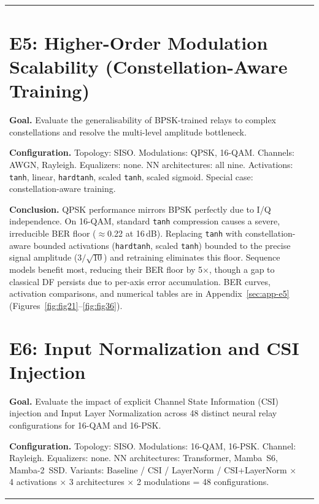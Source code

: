 {\begin{longtable}[]{@{}ll@{}}
\section{E5: Higher-Order Modulation Scalability (Constellation-Aware Training)}\label{sec:higher-order-modulation-scalability-constellation-aware-training}

\textbf{Goal.}
Evaluate the generalisability of BPSK-trained relays to complex constellations and
resolve the multi-level amplitude bottleneck.

\textbf{Configuration.}
Topology: SISO.
Modulations: QPSK, 16-QAM.
Channels: AWGN, Rayleigh.
Equalizers: none.
NN architectures: all nine.
Activations: \texttt{tanh}, linear, \texttt{hardtanh}, scaled \texttt{tanh}, scaled
sigmoid.
Special case: constellation-aware training.

\textbf{Conclusion.}
QPSK performance mirrors BPSK perfectly due to I/Q independence.
On 16-QAM, standard \texttt{tanh} compression causes a severe, irreducible BER floor
($\approx$0.22 at 16\,dB).
Replacing \texttt{tanh} with constellation-aware bounded activations
(\texttt{hardtanh}, scaled \texttt{tanh}) bounded to the precise signal amplitude
($3/\sqrt{10}$) and retraining eliminates this floor.
Sequence models benefit most, reducing their BER floor by 5$\times$, though a gap to
classical DF persists due to per-axis error accumulation.
BER curves, activation comparisons, and numerical tables are in
Appendix~\ref{sec:app-e5}
(Figures~\ref{fig:fig21}--\ref{fig:fig36}).

\section{E6: Input Normalization and CSI Injection}\label{sec:input-normalization-and-csi-injection}

\textbf{Goal.}
Evaluate the impact of explicit Channel State Information (CSI) injection and Input
Layer Normalization across 48 distinct neural relay configurations for 16-QAM and
16-PSK.

\textbf{Configuration.}
Topology: SISO.
Modulations: 16-QAM, 16-PSK.
Channel: Rayleigh.
Equalizers: none.
NN architectures: Transformer, Mamba~S6, Mamba-2~SSD.
Variants: Baseline / CSI / LayerNorm / CSI+LayerNorm $\times$ 4 activations
$\times$ 3 architectures $\times$ 2 modulations = 48 configurations.


\end{longtable}}
